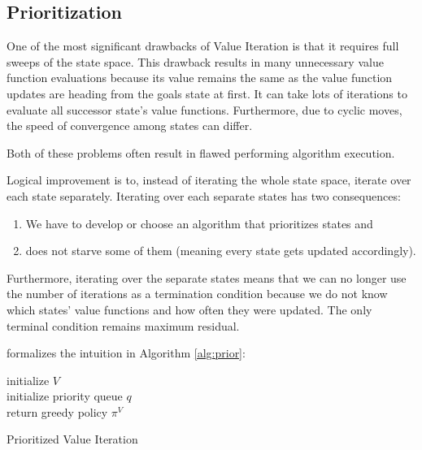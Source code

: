 \subsection{Prioritization}
One of the most significant drawbacks of Value Iteration is that it requires full sweeps of the state space. This drawback results in many unnecessary value function evaluations because its value remains the same as the value function updates are heading from the goals state at first. It can take lots of iterations to evaluate all successor state's value functions. Furthermore, due to cyclic moves, the speed of convergence among states can differ.

Both of these problems often result in flawed performing algorithm execution.

Logical improvement is to, instead of iterating the whole state space, iterate over each state separately. Iterating over each separate states has two consequences:
\begin{enumerate}
    \item We have to develop or choose an algorithm that prioritizes states and 
    \item does not starve some of them (meaning every state gets updated accordingly).
\end{enumerate}

Furthermore, iterating over the separate states means that we can no longer use the number of iterations as a termination condition because we do not know which states' value functions and how often they were updated. The only terminal condition remains maximum residual.

\cite{Kolobov2012} formalizes the intuition in Algorithm \ref{alg:prior}:

\LinesNumbered
\begin{algorithm}[!ht]
\SetAlgoLined
initialize $V$ \\
initialize priority queue $q$ \\
return greedy policy $\pi^{V}$
\caption{Prioritized Value Iteration}
\label{alg:prior}
\end{algorithm}

